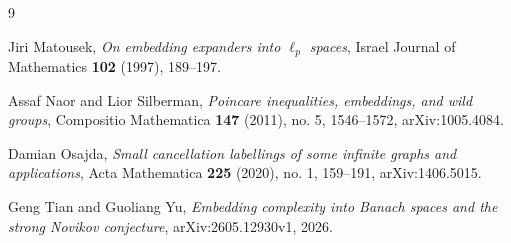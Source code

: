 \documentclass[11pt]{article}
\begin{document}
\begin{thebibliography}{9}

Jiri Matousek,
\emph{On embedding expanders into \(\ell_p\) spaces},
Israel Journal of Mathematics \textbf{102} (1997), 189--197.

Assaf Naor and Lior Silberman,
\emph{Poincare inequalities, embeddings, and wild groups},
Compositio Mathematica \textbf{147} (2011), no. 5, 1546--1572,
arXiv:1005.4084.

Damian Osajda,
\emph{Small cancellation labellings of some infinite graphs and applications},
Acta Mathematica \textbf{225} (2020), no. 1, 159--191,
arXiv:1406.5015.

Geng Tian and Guoliang Yu,
\emph{Embedding complexity into Banach spaces and the strong Novikov
conjecture},
arXiv:2605.12930v1, 2026.

\end{thebibliography}
\end{document}
